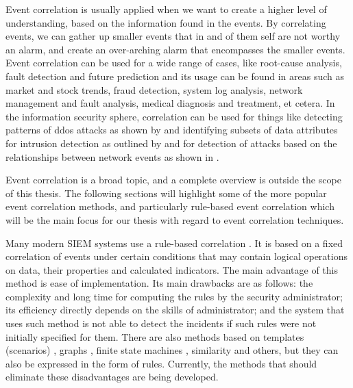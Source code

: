 Event correlation is usually applied when we want to create a higher level of understanding, based on the information found in the events. By correlating events, we can gather up smaller events that in and of them self are not worthy an alarm, and create an over-arching alarm that encompasses the smaller events. Event correlation can be used for a wide range of cases, like root-cause analysis, fault detection and future prediction and its usage can be found in areas such as market and stock trends, fraud detection, system log analysis, network management and fault analysis, medical diagnosis and treatment, et cetera. In the information security sphere, correlation can be used for things like detecting patterns of \acrfull{ddos} attacks as shown by \textcite{wei_2013} and identifying subsets of data attributes for intrusion detection as outlined by \textcite{Jiang_2004} and for detection of attacks based on the relationships between network events as shown in \textcite{kruegel_2004}.

Event correlation is a broad topic, and a complete overview is outside the scope of this thesis. The following sections will highlight some of the more popular event correlation methods, and particularly rule-based event correlation which will be the main focus for our thesis with regard to event correlation techniques. 

\iffalse
Many modern SIEM systems use a rule-based correlation \textcite{hanemann_2008} \textcite{limmer_2008}. It is based on a fixed correlation of events under certain conditions that may contain logical operations on data, their properties and calculated indicators. The main advantage of this method is ease of implementation. Its main drawbacks are as follows: the complexity and long time for computing the rules by the security administrator; its efficiency directly depends on the skills of administrator; and the system that uses such method is not able to detect the incidents if such rules were not initially specified for them.
There are also
methods based on templates (scenarios) \textcite{hanemann_2008}, graphs \textcite{ghorbani_2009} \textcite{xu_2006}, finite state machines \textcite{hasan_1999} \textcite{xu_2006}, similarity \textcite{gurer_1996} \textcite{zurutuza_2004}
and others, but they can also be expressed in the form of rules.
Currently, the methods that should eliminate these disadvantages are being
developed.

